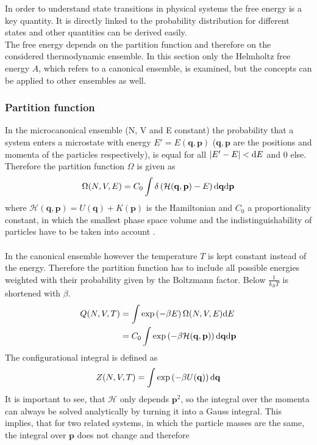 In order to understand state transitions in physical systems the free energy is a key quantity. It is directly linked to the probability distribution for different states and other quantities can be derived easily.\\
The free energy depends on the partition function and therefore on the considered thermodynamic ensemble. In this section only the Helmholtz free energy $A$, which refers to a canonical ensemble, is examined, but the concepts can be applied to other ensembles as well.
\subsubsection{Partition function}
In the microcanonical ensemble (N, V and E constant) the probability that a system enters a microstate with energy $E' = E(\mathbf{q}, \mathbf{p})$ ($\mathbf{q}, \mathbf{p}$ are the positions and momenta of the particles respectively), is equal for all $\left|E' - E\right| < \text{d} E$ and $0$ else. Therefore the partition function $\Omega$ is given as
\begin{equation}
\label{eq:partfunc}
\Omega(N, V, E) = C_0 \int \delta\left(\mathcal{H}(\mathbf{q}, \mathbf{p}) - E\right) \text{d} \mathbf{q} \text{d} \mathbf{p}
\end{equation}
where $\mathcal{H}(\mathbf{q}, \mathbf{p}) = U(\mathbf{q}) + K(\mathbf{p})$ is the Hamiltonian and $C_0$ a proportionality constant, in which the smallest phase space volume and the indistinguishability of particles have to be taken into account \autocite[16]{freeEnergyBook}.\\
\\
In the canonical ensemble however the temperature $T$ is kept constant instead of the energy. Therefore the partition function has to include all possible energies weighted with their probability given by the Boltzmann factor. Below $\frac{1}{k_B T}$ is shortened with $\beta$.
\begin{align}
Q(N, V, T) &= \int \exp\left(-\beta E\right) \Omega(N, V, E) \text{d} E\\
&= C_0 \int \exp\left(-{\beta\mathcal{H}(\mathbf{q}, \mathbf{p})}\right) \text{d} \mathbf{q} \text{d} \mathbf{p}
\end{align}
The configurational integral is defined as 
\begin{equation}
Z(N, V, T) = \int \exp\left(-{\beta U}(\mathbf{q})\right) \text{d} \mathbf{q}
\end{equation}
It is important to see, that $\mathcal{H}$ only depends $\mathbf{p}^2$, so the integral over the momenta can always be solved analytically by turning it into a Gauss integral. This implies, that for two related systems, in which the particle masses are the same, the integral over $\mathbf{p}$ does not change and therefore
